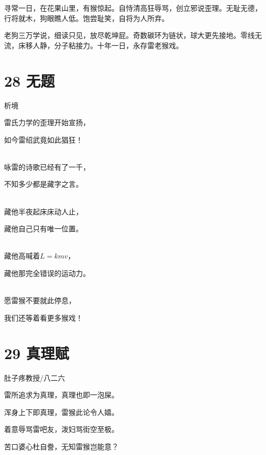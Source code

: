 \documentclass[UTF8,12pt,oneside]{ctexbook}
\begin{document}
        寻常一日，在花果山里，有猴惊起。自恃清高狂辱骂，创立邪说歪理。无耻无德，行将就木，狗眼瞧人低。饱尝耻笑，自将为人所弃。 
        
        老狗三万学说，细读只见，放尽乾坤屁。奇数碳环为链状，球大更先接地。零线无流，床移人静，分子粘接力。十年一日，永存雷老猴戏。
        
    \section{28 无题}
        \begin{center}
            析境
        \end{center}
            
        \begin{center}
            雷氏力学的歪理开始宣扬，
            
            如今雷绍武竟如此猖狂！
        
            ~\\
            咏雷的诗歌已经有了一千，
            
            不知多少都是藏字之言。
            
            ~\\
            藏他半夜起床床动人止，
            
            藏他自己只有唯一位置。
            
            ~\\
            藏他高喊着$L=kmv$，
            
            藏他那完全错误的运动力。
            
            ~\\
            愿雷猴不要就此停息，
            
            我们还等着看更多猴戏！
        \end{center}
        
        \section{29 真理赋}
        \begin{center}
            肚子疼教授/八二六
        \end{center}
            
        \begin{center}
            雷所追求为真理，真理也即一泡屎。
        
            浑身上下即真理，雷猴此论令人嬉。
        
            着意辱骂雷吧友，泼妇骂街空至极。
            
            苦口婆心杜自誊，无知雷猴岂能意？
        \end{center}
        
\end{document}
